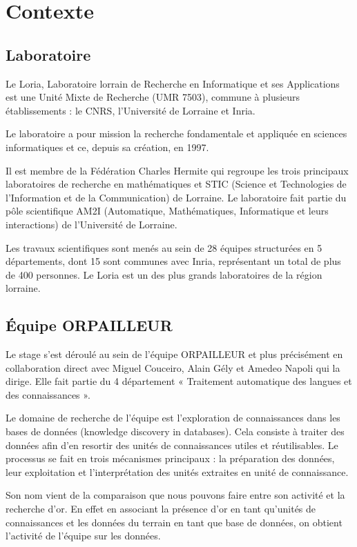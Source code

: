 \chapter{Contexte}

\section{Laboratoire}

Le Loria, Laboratoire lorrain de Recherche en Informatique et ses Applications est une Unité Mixte de Recherche (UMR 7503), commune à plusieurs établissements : le CNRS, l’Université de Lorraine et Inria.

\bigbreak

Le laboratoire a pour mission la recherche fondamentale et appliquée en sciences informatiques et ce, depuis sa création, en 1997.

\bigbreak

Il est membre de la Fédération Charles Hermite qui regroupe les trois principaux  laboratoires de recherche en mathématiques et STIC (Science et Technologies de l’Information et de la Communication) de Lorraine. Le laboratoire fait partie du pôle scientifique AM2I (Automatique, Mathématiques, Informatique et leurs interactions) de l’Université de Lorraine.

\bigbreak

Les travaux scientifiques sont menés au sein de 28 équipes structurées en 5 départements, dont 15 sont communes avec Inria, représentant un total de plus de 400 personnes. Le Loria est un des plus grands laboratoires de la région lorraine.

\section{Équipe ORPAILLEUR}

Le stage s'est déroulé au sein de l'équipe ORPAILLEUR et plus précisément en collaboration direct avec Miguel Couceiro, Alain Gély et Amedeo Napoli qui la dirige. Elle fait partie du 4 département « Traitement automatique des langues et des connaissances ». 

\bigbreak

Le domaine de recherche de l'équipe est l'exploration de connaissances dans les bases de données (knowledge discovery in databases). Cela consiste à traiter des données afin d'en resortir des unités de connaissances utiles et réutilisables. Le processus se fait en trois mécanismes principaux : la préparation des données, leur exploitation et l'interprétation des unités extraites en unité de connaissance.

\bigbreak

Son nom vient de la comparaison que nous pouvons faire entre son activité et la recherche d'or. En effet en associant la présence d'or en tant qu'unités de connaissances et les données du terrain en tant que base de données, on obtient l'activité de l'équipe sur les données.